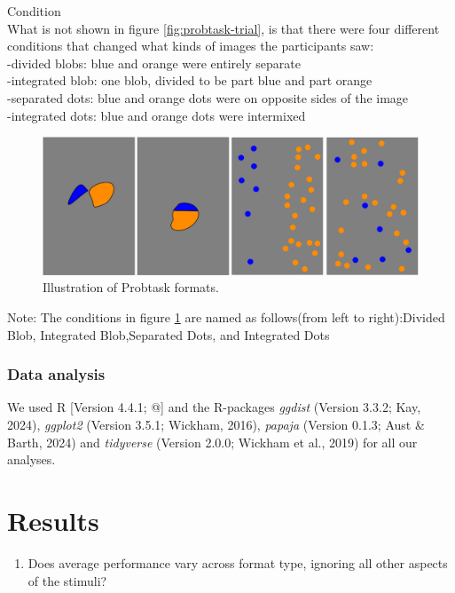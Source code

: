 \documentclass[
  man,floatsintext]{apa6}
\providecommand{\tightlist}{%
  \setlength{\itemsep}{0pt}\setlength{\parskip}{0pt}}
\begin{document}
Condition\\
What is not shown in figure \ref{fig:probtask-trial}, is that there were four different conditions that changed what kinds of images the participants saw:\\
-divided blobs: blue and orange were entirely separate\\
-integrated blob: one blob, divided to be part blue and part orange\\
-separated dots: blue and orange dots were on opposite sides of the image\\
-integrated dots: blue and orange dots were intermixed\\

\begin{figure}[H]
  \centering
  \includegraphics[width=0.5\linewidth]{images_WA10/Probtask_formats.png}
  \caption{Illustration of Probtask formats.}
  \label{fig:probtask-format}
\end{figure}

Note: The conditions in figure \ref{fig:probtask-format} are named as follows(from left to right):Divided Blob, Integrated Blob,Separated Dots, and Integrated Dots
\clearpage

\subsubsection{Data analysis}\label{data-analysis}

We used R {[}Version 4.4.1; @{]} and the R-packages \emph{ggdist} (Version 3.3.2; Kay, 2024), \emph{ggplot2} (Version 3.5.1; Wickham, 2016), \emph{papaja} (Version 0.1.3; Aust \& Barth, 2024) and \emph{tidyverse} (Version 2.0.0; Wickham et al., 2019) for all our analyses.

\section{Results}\label{results}

\begin{enumerate}
\def\labelenumi{\arabic{enumi}.}
\tightlist
\item
  Does average performance vary across format type, ignoring all other aspects of the stimuli?
\end{enumerate}
\end{document}
